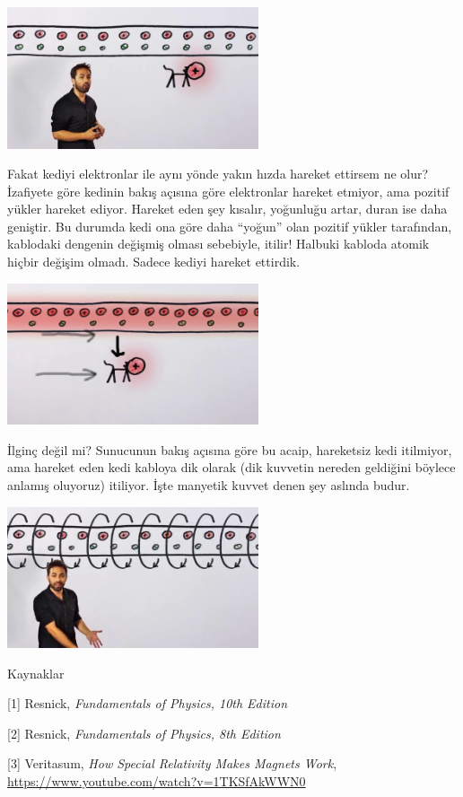 \documentclass[12pt,fleqn]{article}\usepackage{../../common}
\begin{document}
\includegraphics[width=20em]{19_04.jpg}

Fakat kediyi elektronlar ile aynı yönde yakın hızda hareket ettirsem ne olur?
İzafiyete göre kedinin bakış açısına göre elektronlar hareket etmiyor, ama
pozitif yükler hareket ediyor. Hareket eden şey kısalır, yoğunluğu artar,
duran ise daha geniştir. Bu durumda kedi ona göre daha ``yoğun'' olan pozitif
yükler tarafından, kablodaki dengenin değişmiş olması sebebiyle, itilir! Halbuki
kabloda atomik hiçbir değişim olmadı. Sadece kediyi hareket ettirdik. 

\includegraphics[width=20em]{19_05.jpg}

İlginç değil mi? Sunucunun bakış açısına göre bu acaip, hareketsiz kedi
itilmiyor, ama hareket eden kedi kabloya dik olarak (dik kuvvetin nereden
geldiğini böylece anlamış oluyoruz) itiliyor. İşte manyetik kuvvet denen şey
aslında budur.

\includegraphics[width=20em]{19_06.jpg}

Kaynaklar

[1] Resnick, {\em Fundamentals of Physics, 10th Edition}

[2] Resnick, {\em Fundamentals of Physics, 8th Edition}

[3] Veritasum, {\em How Special Relativity Makes Magnets Work},
    \url{https://www.youtube.com/watch?v=1TKSfAkWWN0}
\end{document}
